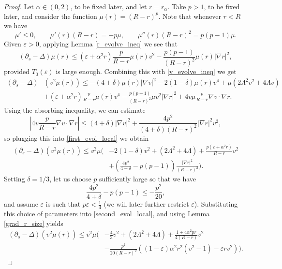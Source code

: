\documentclass[leqno,11pt]{amsart}
\theoremstyle{definition}
\begin{document}
\begin{proof}
Let $\alpha\in (0,2)$, to be fixed later, and let $r=r_{\alpha}$. Take $p>1$, to be fixed later, and consider the function $\mu(r)=(R-r)^p$. Note that whenever $r<R$ we have
\begin{equation}
\mu'\leq 0,\qquad \mu'(r)(R-r)=-p\mu,\qquad \mu''(r)(R-r)^2=p(p-1)\mu.
\end{equation}
Given $\varepsilon>0$, applying Lemma \ref{r_evolve_ineq} we see that 
\begin{equation}
(\partial_s-\Delta)\mu(r) \leq  (\varepsilon+\alpha^2 r)\frac{p}{R-r}\mu(r)v^2 -\frac{p(p-1)}{(R-r)^2}\mu(r)|\nabla r|^2,
\end{equation}
provided $T_0(\varepsilon)$ is large enough. Combining this with \eqref{v_evolve_ineq} we get
\begin{align}\label{first_evol_local}
(\partial_s-\Delta)&(v^2\mu(r)) \leq -(4+\delta)\mu(r)|\nabla v|^2-2(1-\delta)\mu(r)v^4+\mu (2\Lambda^2v^2+4\Lambda v) \nonumber \\
 &+(\varepsilon+\alpha^2 r)\frac{p}{R-r}\mu(r)v^4-\frac{p(p-1)}{(R-r)^2}\mu v^2|\nabla r|^2+4v\mu\frac{p}{R-r} \nabla v \cdot \nabla r. 
\end{align}
Using the absorbing inequality, we can estimate
\begin{equation}
\left|4v\frac{p}{R-r} \nabla v\cdot \nabla r\right| \leq (4+\delta)|\nabla v|^2+ \frac{4p^2}{(4+\delta)(R-r)^2}|\nabla r|^2v^2,
\end{equation}
so plugging this into \eqref{first_evol_local} we obtain
\begin{align}\label{second_evol_local}
(\partial_s-\Delta)(v^2\mu(r)) \leq v^2\mu\Big(&-2(1-\delta)v^2+ (2\Lambda^2+4\Lambda)+\frac{p(\varepsilon+\alpha^2 r)}{R-r}v^2 \nonumber\\
&+\left(\frac{4p^2}{4+\delta}-p(p-1)\right)\frac{|\nabla r|^2}{(R-r)^2}\Big).
\end{align}
{Setting} $\delta=1/3$, let us {choose} $p$ sufficiently large so that we have 
\begin{equation}\label{p_size}
\frac{4p^2}{4+\delta}-p(p-1) \leq -\frac{p^2}{20},
\end{equation}
and assume $\varepsilon$ is such that { $p\varepsilon<\frac{1}{4}$} (we will later further restrict  $\varepsilon$). Substituting this choice of parameters into  \eqref{second_evol_local}, and using Lemma \ref{grad_r_size} yields  
\begin{align}\label{second_evol_local2}
(\partial_s-\Delta)(v^2\mu(r)) \leq v^2\mu\Big(&-\frac{4}{3}v^2+ (2\Lambda^2+4\Lambda)+\frac{1+4\alpha^2pr}{4(R-r)}v^2\nonumber \\
&-\frac{p^2}{20(R-r)^2}\left((1-\varepsilon)\alpha^2r^2(v^2-1)-\varepsilon rv^2\right) \Big).
\end{align}


\end{proof}
\end{document}
